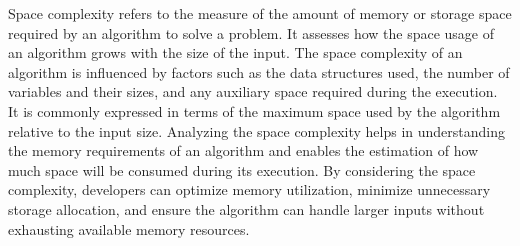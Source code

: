 Space complexity refers to the measure of the amount of memory or storage space required by an algorithm to solve a problem. It assesses how the space usage of an algorithm grows with the size of the input. The space complexity of an algorithm is influenced by factors such as the data structures used, the number of variables and their sizes, and any auxiliary space required during the execution. It is commonly expressed in terms 
of the maximum space used by the algorithm relative to the input size. Analyzing the space complexity helps in understanding the memory requirements of an algorithm and enables the estimation of how much space will be consumed during its execution. By considering the space complexity, developers can optimize memory utilization, minimize unnecessary storage allocation, and ensure the algorithm can handle larger inputs without 
exhausting available memory resources.

